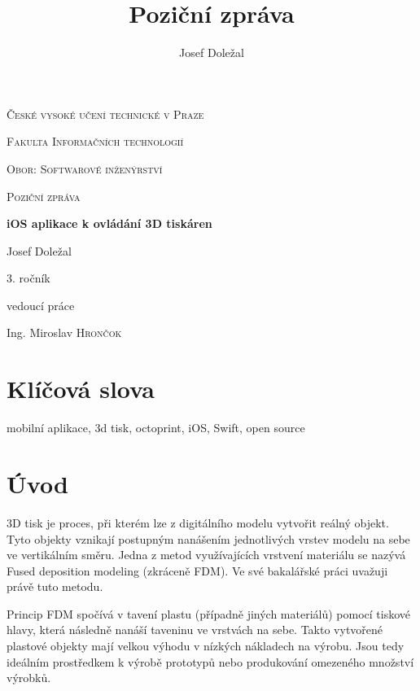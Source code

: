 \documentclass[czech]{article}
\begin{document}
\title{Poziční zpráva}
\author{Josef Doležal}

\begin{titlepage}
	\centering
	{\scshape\LARGE České vysoké učení technické v Praze \par}
	{\scshape\Large Fakulta Informačních technologií \par}
	{\scshape\Large Obor: Softwarové inženýrství \par}
	\vspace{1cm}
	{\scshape\Large Poziční zpráva\par}
	\vspace{1.5cm}
	{\huge\bfseries iOS aplikace k ovládání 3D tiskáren\par}
	\vspace{2cm}
	{\Large Josef Doležal\par}
	{\normalsize 3. ročník\par}
	\vfill
	vedoucí práce\par
	Ing. Miroslav \textsc{Hrončok}

	\vfill
\end{titlepage}

\newpage

\tableofcontents{}

\newpage

\section{Klíčová slova}

mobilní aplikace, 3d tisk, octoprint, iOS, Swift, open source


\section{Úvod}

3D tisk je proces, při kterém lze z digitálního modelu vytvořit reálný objekt. Tyto objekty vznikají postupným nanášením jednotlivých vrstev modelu na sebe ve vertikálním směru. Jedna z metod využívajících vrstvení materiálu se nazývá Fused deposition modeling (zkráceně FDM). Ve své bakalářské práci uvažuji právě tuto metodu.

Princip FDM spočívá v tavení plastu (případně jiných materiálů) pomocí tiskové hlavy, která následně nanáší taveninu ve vrstvách na sebe\cite{fdm}. Takto vytvořené plastové objekty mají velkou výhodu v nízkých nákladech na výrobu. Jsou tedy ideálním prostředkem k výrobě prototypů nebo produkování omezeného množství výrobků.
\end{document}
